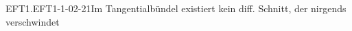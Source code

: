 \begin{EXA}{EFT1.EFT1-1-02-21}{Im Tangentialbündel existiert kein diff. Schnitt, der nirgends verschwindet}

\end{EXA}
